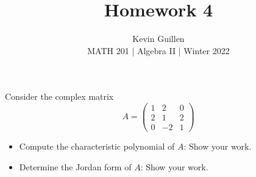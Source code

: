 \documentclass[11pt]{article}
\newenvironment{problem}[2][Problem\!]{\begin{trivlist}
\item[\hskip \labelsep {\bfseries #1}\hskip \labelsep {\bfseries #2}]}{\end{trivlist}}
\begin{document}
 
\title{Homework 4}
\author{Kevin Guillen\\[0.5em]
MATH 201 | Algebra II | Winter 2022}
\date{} 
\maketitle


\begin{tcolorbox}
  \begin{problem} {1}
    Consider the complex matrix
    \[A = \begin{pmatrix}
        1 & 2 & 0 \\
        2 & 1 & 2 \\
        0 & -2 & 1
    \end{pmatrix}\]
    \begin{itemize}
        \item[(1)] Compute the characteristic polynomial of $A$: Show your work.
        \item[(2)] Determine the Jordan form of $A$: Show your work.
    \end{itemize}
  \end{problem}
\end{tcolorbox}
\end{document}
